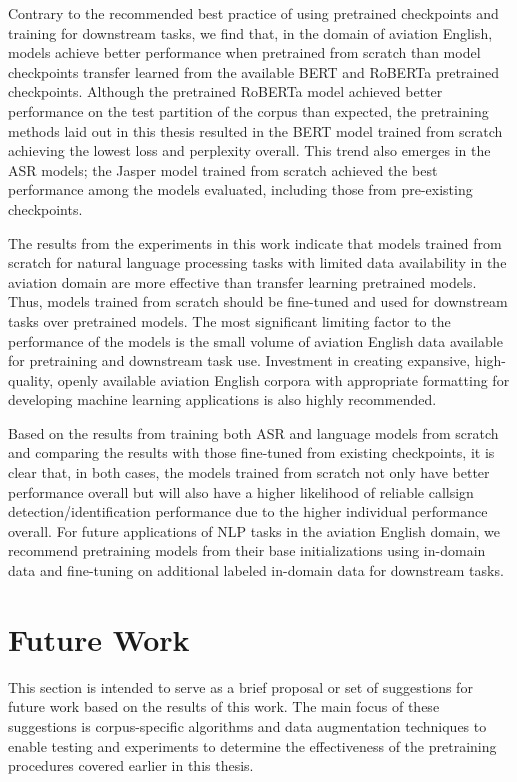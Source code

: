 \documentclass[12pt]{article}
\begin{document}
Contrary to the recommended best practice of using pretrained checkpoints and training for downstream tasks, we find that, in the domain of aviation
English, models achieve better performance when pretrained from scratch than model checkpoints transfer learned from the available BERT and RoBERTa
pretrained checkpoints. Although the pretrained RoBERTa model achieved better performance on the test partition of the corpus than expected, the
pretraining methods laid out in this thesis resulted in the BERT model trained from scratch achieving the lowest loss and perplexity overall. This
trend also emerges in the ASR models; the Jasper model trained from scratch achieved the best performance among the models evaluated, including those
from pre-existing checkpoints.

The results from the experiments in this work indicate that models trained from scratch for natural language processing tasks with limited data
availability in the aviation domain are more effective than transfer learning pretrained models. Thus, models trained from scratch should be
fine-tuned and used for downstream tasks over pretrained models. The most significant limiting factor to the performance of the models is the small
volume of aviation English data available for pretraining and downstream task use. Investment in creating expansive, high-quality, openly available
aviation English corpora with appropriate formatting for developing machine learning applications is also highly recommended.

Based on the results from training both ASR and language models from scratch and comparing the results with those fine-tuned from existing
checkpoints, it is clear that, in both cases, the models trained from scratch not only have better performance overall but will also have a higher
likelihood of reliable callsign detection/identification performance due to the higher individual performance overall. For future applications
of NLP tasks in the aviation English domain, we recommend pretraining models from their base initializations using in-domain data and fine-tuning on
additional labeled in-domain data for downstream tasks.

\section{Future Work}\label{sec:future_work}
This section is intended to serve as a brief proposal or set of suggestions for future work based on the results of this work. The main focus of these
suggestions is corpus-specific algorithms and data augmentation techniques to enable testing and experiments to determine the effectiveness of the
pretraining procedures covered earlier in this thesis.
\end{document}
